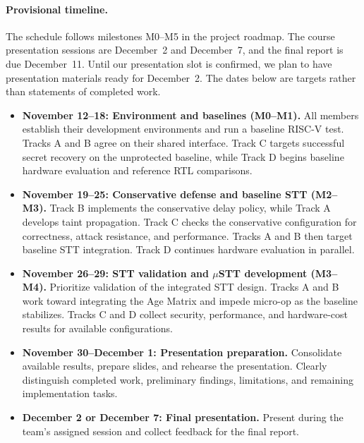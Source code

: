 \paragraph{Provisional timeline.}
The schedule follows milestones M0--M5 in the project
roadmap. The course presentation sessions are
December~2 and December~7, and the final report is due
December~11. Until our presentation slot is confirmed,
we plan to have presentation materials ready for
December~2. The dates below are targets rather than
statements of completed work.

\begin{itemize}
    \item \textbf{November 12--18:
    Environment and baselines (M0--M1).}
    All members establish their development environments
    and run a baseline RISC-V test. Tracks A and B agree
    on their shared interface. Track C targets successful
    secret recovery on the unprotected baseline, while
    Track D begins baseline hardware evaluation and
    reference RTL comparisons.

    \item \textbf{November 19--25:
    Conservative defense and baseline STT (M2--M3).}
    Track B implements the conservative delay policy,
    while Track A develops taint propagation.
    Track C checks the conservative configuration for
    correctness, attack resistance, and performance.
    Tracks A and B then target baseline STT integration.
    Track D continues hardware evaluation in parallel.

    \item \textbf{November 26--29:
    STT validation and $\mu$STT development (M3--M4).}
    Prioritize validation of the integrated STT design.
    Tracks A and B work toward integrating the Age Matrix
    and impede micro-op as the baseline stabilizes.
    Tracks C and D collect security, performance, and
    hardware-cost results for available configurations.

    \item \textbf{November 30--December 1:
    Presentation preparation.}
    Consolidate available results, prepare slides,
    and rehearse the presentation. Clearly distinguish
    completed work, preliminary findings, limitations,
    and remaining implementation tasks.

    \item \textbf{December 2 or December 7:
    Final presentation.}
    Present during the team's assigned session and
    collect feedback for the final report.


\end{itemize}
